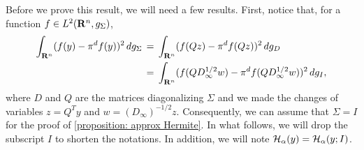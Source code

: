 Before we prove this result, we will need a few results. First, notice that,
for a function $f \in L^2(\mathbf R^n, g_{\Sigma})$,
\begin{align}
    \int_{\mathbf R^n} (f(y)-\pi^d f(y))^2 \,dg_{\Sigma} &\,=\,
    \int_{\mathbf R^n} (f(Qz) - \pi^df(Qz))^2 \, dg_{D}  \\ &\,=\,
    \int_{\mathbf R^n} (f(QD_\infty^{1/2}w) - \pi^df(QD_\infty^{1/2}w))^2 \, dg_{I},
\end{align}
where $D$ and $Q$ are the matrices diagonalizing $\Sigma$ and we made the
changes of variables $z = Q^T y$ and $w = (D_\infty)^{-1/2}z$. Consequently, we
can assume that $\Sigma = I$ for the proof of \ref{proposition: approx
Hermite}. In what follows, we will drop the subscript $I$ to shorten the notations.
In addition, we will note $\mathcal H_\alpha(y) = \mathcal H_\alpha(y; I)$.

